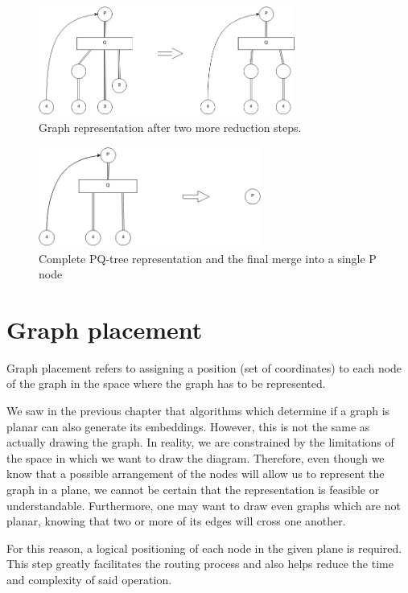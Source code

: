 \begin{figure}[ht] \centering
\includegraphics[width=0.75\textwidth]{img/algdesing/vertex_reduction_step_2.png}
\caption{Graph representation after two more reduction steps. \label{vertex2}} \end{figure}

\begin{figure}[ht] \centering
\includegraphics[width=0.65\textwidth]{img/algdesing/vertex_reduction_3.png}
\caption{Complete PQ-tree representation and the final merge into a single P node \label{vertex3}} \end{figure}

\section{Graph placement}

Graph placement refers to assigning a position (set of coordinates) to each node of the graph in the space where 
the graph has to be represented.

We saw in the previous chapter that algorithms which determine if a graph is planar can also generate its 
embeddings. However, this is not the same as actually drawing the graph. In reality, we are constrained by the 
limitations of the space in which we want to draw the diagram. Therefore, even though we know that a possible 
arrangement of the nodes will allow us to represent the graph in a plane, we cannot be certain that the 
representation is feasible or understandable. Furthermore, one may want to draw even graphs which are not planar, 
knowing that two or more of its edges will cross one another.

For this reason, a logical positioning of each node in the given plane is required. This step greatly facilitates 
the routing process and also helps reduce the time and complexity of said operation.

